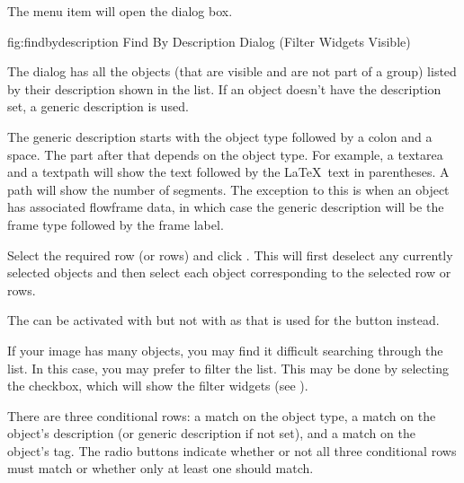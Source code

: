 %
The  menu item will open the
 dialog box. 


\FloatFig
 {fig:findbydescription}
 {}
 {Find By Description Dialog (Filter Widgets Visible)}


The  dialog has all the
\glspl{object} (that are visible and are not part of a \gls{group}) listed by their
description shown in the 
list. If an object doesn't have the description set, a
generic description is used. 

The generic description starts with the object type followed by a
colon and a space. The part after that depends on the object type.
For example, a \gls{textarea} and a \gls{textpath} will show the
text followed by the \LaTeX\ text in parentheses. A path will show
the number of segments. The exception to this is when an object has
associated \gls{flowframe} data, in which case the generic
description will be the frame type followed by the frame label.

Select the required row (or rows) and
click .  This will first deselect any currently selected
\glspl{object} and then select each object corresponding to the
selected row or rows.

\begin{important}
The  can be activated with
 but not with
 as that is used for the
 button instead.
\end{important}


If your image has many \glspl{object}, you may find it difficult
searching through the list. In this case, you may prefer to filter
the list. This may be done by selecting the 
checkbox, which will show the filter widgets (see ).

There are three conditional rows: a match on the object type, a
match on the object's description (or generic description if not
set), and a match on the object's tag. The 
radio buttons indicate whether or not all three conditional rows
must match or whether only at least one should match.

